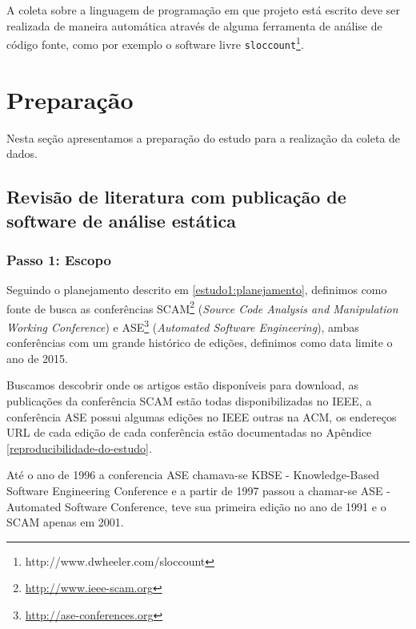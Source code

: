 
A coleta sobre a linguagem de programação em que projeto está escrito deve ser
realizada de maneira automática através de alguma ferramenta de análise de
código fonte, como por exemplo o software livre
\texttt{sloccount}\footnote{http://www.dwheeler.com/sloccount}.


\section{Preparação} \label{estudo1:preparacao} %

Nesta seção apresentamos a preparação do estudo para a realização da coleta de
dados.

\subsection{Revisão de literatura com publicação de software de análise estática}

\subsubsection{Passo 1: Escopo}

Seguindo o planejamento descrito em \ref{estudo1:planejamento}, definimos como
fonte de busca as conferências SCAM\footnote{\url{http://www.ieee-scam.org}}
({\it Source Code Analysis and Manipulation Working Conference}) e
ASE\footnote{\url{http://ase-conferences.org}} ({\it Automated Software
Engineering}), ambas conferências com um grande histórico de edições, definimos
como data limite o ano de 2015.

Buscamos descobrir onde os artigos estão disponíveis para download, as
publicações da conferência SCAM estão todas disponibilizadas no IEEE, a
conferência ASE possui algumas edições no IEEE outras na ACM, os endereços URL
de cada edição de cada conferência estão documentadas no Apêndice
\ref{reproducibilidade-do-estudo}.

Até o ano de 1996 a conferencia ASE chamava-se KBSE - Knowledge-Based Software
Engineering Conference e a partir de 1997 passou a chamar-se ASE - Automated
Software Conference, teve sua primeira edição no ano de 1991 e o SCAM apenas em
2001.

